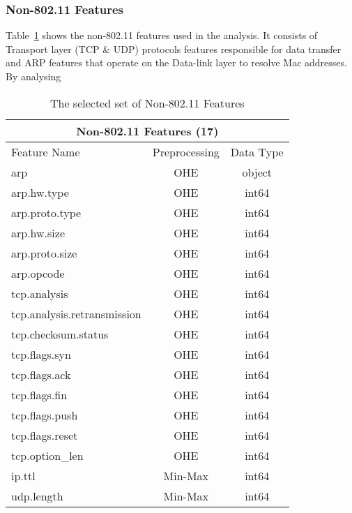 \subsubsection{Non-802.11 Features}

Table~\ref{tab:non80211} shows the non-802.11 features used in the analysis. It consists of Transport layer (TCP \& UDP) protocols features responsible for data transfer and ARP features that operate on the Data-link layer to resolve Mac addresses. By analysing 

\begin{table}[H]
\centering
\begin{tabular}{lcc}
\hline
\multicolumn{3}{c}{\textbf{Non-802.11 Features (17)}} \\ \hline
Feature Name & Preprocessing & Data Type \\ \hline
arp & OHE & object \\
arp.hw.type & OHE & int64 \\
arp.proto.type & OHE & int64 \\
arp.hw.size & OHE & int64 \\
arp.proto.size & OHE & int64 \\
arp.opcode & OHE & int64 \\
tcp.analysis & OHE & int64 \\
tcp.analysis.retransmission & OHE & int64 \\
tcp.checksum.status & OHE & int64 \\
tcp.flags.syn & OHE & int64 \\
tcp.flags.ack & OHE & int64 \\
tcp.flags.fin & OHE & int64 \\
tcp.flags.push & OHE & int64 \\
tcp.flags.reset & OHE & int64 \\
tcp.option\_len & OHE & int64 \\
ip.ttl & Min-Max & int64 \\
udp.length & Min-Max & int64 \\ \hline
\end{tabular}
\caption{The selected set of Non-802.11 Features}
\label{tab:non80211}
\end{table}
